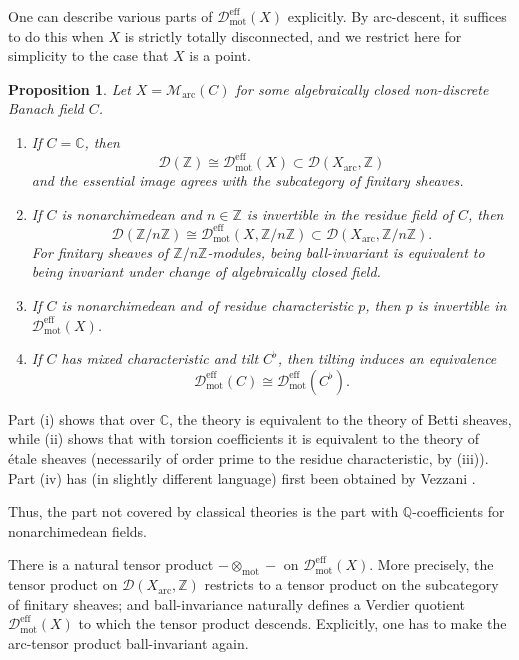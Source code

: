\documentclass[11pt]{amsart}
\numberwithin{equation}{section}
\numberwithin{theorem}{section}
\newtheorem{proposition}[theorem]{Proposition}
\theoremstyle{definition}
\begin{document}
One can describe various parts of $\mathcal D_{\mathrm{mot}}^{\mathrm{eff}}(X)$ explicitly. By arc-descent, it suffices to do this when $X$ is strictly totally disconnected, and we restrict here for simplicity to the case that $X$ is a point.

\begin{proposition} Let $X=\mathcal M_{\mathrm{arc}}(C)$ for some algebraically closed non-discrete Banach field $C$.
\begin{enumerate}
\item[{\rm (i)}] If $C=\mathbb C$, then
\[
\mathcal D(\mathbb Z)\cong \mathcal D_{\mathrm{mot}}^{\mathrm{eff}}(X)\subset \mathcal D(X_{\mathrm{arc}},\mathbb Z)
\]
and the essential image agrees with the subcategory of finitary sheaves.
\item[{\rm (ii)}] If $C$ is nonarchimedean and $n\in \mathbb Z$ is invertible in the residue field of $C$, then
\[
\mathcal D(\mathbb Z/n\mathbb Z)\cong \mathcal D_{\mathrm{mot}}^{\mathrm{eff}}(X,\mathbb Z/n\mathbb Z)\subset \mathcal D(X_{\mathrm{arc}},\mathbb Z/n\mathbb Z).
\]
For finitary sheaves of $\mathbb Z/n\mathbb Z$-modules, being ball-invariant is equivalent to being invariant under change of algebraically closed field.
\item[{\rm (iii)}] If $C$ is nonarchimedean and of residue characteristic $p$, then $p$ is invertible in $\mathcal D_{\mathrm{mot}}^{\mathrm{eff}}(X)$.
\item[{\rm (iv)}] If $C$ has mixed characteristic and tilt $C^\flat$, then tilting induces an equivalence
\[
\mathcal D_{\mathrm{mot}}^{\mathrm{eff}}(C)\cong \mathcal D_{\mathrm{mot}}^{\mathrm{eff}}(C^\flat).
\]
\end{enumerate}
\end{proposition}

Part (i) shows that over $\mathbb C$, the theory is equivalent to the theory of Betti sheaves, while (ii) shows that with torsion coefficients it is equivalent to the theory of \'etale sheaves (necessarily of order prime to the residue characteristic, by (iii)). Part (iv) has (in slightly different language) first been obtained by Vezzani \cite{Vezzani}.

Thus, the part not covered by classical theories is the part with $\mathbb Q$-coefficients for nonarchimedean fields.

There is a natural tensor product $-\otimes_{\mathrm{mot}}-$ on $\mathcal D_{\mathrm{mot}}^{\mathrm{eff}}(X)$. More precisely, the tensor product on $\mathcal D(X_{\mathrm{arc}},\mathbb Z)$ restricts to a tensor product on the subcategory of finitary sheaves; and ball-invariance naturally defines a Verdier quotient $\mathcal D_{\mathrm{mot}}^{\mathrm{eff}}(X)$ to which the tensor product descends. Explicitly, one has to make the arc-tensor product ball-invariant again.
\end{document}
